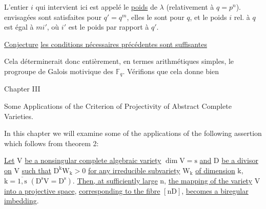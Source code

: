 L'entier $i$ qui intervient ici est appelé le \uline{poids} de $\lambda$
(relativement à $q=p^n$). 
  envisagées sont satisfaites  pour
$q'=q^m$, elles le sont pour $q$, et le poids $i$
rel. à $q$ est égal à $mi'$, où $i'$ est le poids par
rapport à $q'$.

\uline{Conjecture}  \uline{} \uline{les conditions nécessaires
précédentes sont suffisantes}

Cela déterminerait donc entièrement, en termes
arithmétiques simples, le progroupe de Galois  motivique
des $\mathbb F_q$. Vérifions que cela donne bien

\begin{center}
Chapter III

Some Applications of the Criterion of Projectivity
of Abstract Complete Varieties.
\end{center}

In this chapter we will examine some of the applications
of the following assertion which follows from theorem 2:

\uline{Let} $\mathrm{V}$ \uline{be a nonsingular complete algebraic variety}
$\mathrm{\dim V=s}$ \uline{and} $\mathrm{D}$ \uline{be a divisor on} $\mathrm{V}$ \uline{such that} $\mathrm{D^k W_k>0}$
\uline{for any irreducible subvariety} $\mathrm{W_k}$ \uline{of dimension}
$\mathrm{k}$, $\mathrm{k=\overline{1,s}}$ $\mathrm{(D^sV=D^s)}$. \uline{Then, at sufficiently large} $\mathrm{n}$,
\uline{the mapping of the variety} $\mathrm{V}$ \uline{into a projective space},
\uline{corresponding to the fibre} $\mathrm{[nD]}$, \uline{becomes a biregular
imbedding}.

